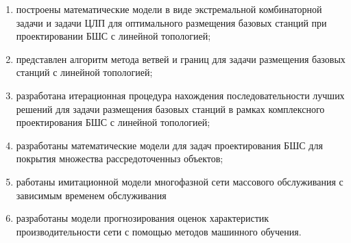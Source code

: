 \begin{enumerate}
  \item построены математические модели в виде экстремальной комбинаторной задачи и задачи ЦЛП для оптимального размещения базовых станций при проектировании БШС с линейной топологией;
  \item представлен алгоритм метода ветвей и границ для задачи размещения базовых станций с линейной топологией; 
  \item разработана итерационная процедура нахождения последовательности лучших решений для задачи размещения базовых станций в рамках комплексного проектирования БШС с линейной топологией;
  \item разработаны математические модели для задач проектирования БШС для покрытия множества рассредоточенныз объектов;
  \item работаны имитационной модели многофазной сети массового обслуживания с зависимым временем обслуживания
  \item разработаны модели прогнозирования оценок характеристик производительности сети с помощью методов машинного обучения.
\end{enumerate}
